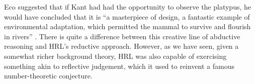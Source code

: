 Eco suggested that if Kant had had the opportunity to observe the platypus, he would have concluded that it is ``a masterpiece of design, a fantastic example of environmental adaptation, which permitted the mammal to survive and flourish in rivers'' \cite[p.~93]{eco2000kant}.  There is quite a difference between this creative line of abductive reasoning and {\sf HRL}'s reductive approach.  However, as we have seen, given a somewhat richer background theory, {\sf HRL} was also capable of exercising something akin to reflective judgement, which it used to reinvent a famous number-theoretic conjecture.
